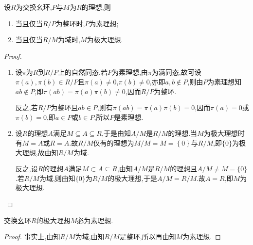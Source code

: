 \documentclass[../../main.tex]{subfiles}%
\begin{document}
\begin{theorem}\label{theorem:抽象代数--定理2.8.1}
设$R$为交换幺环,$P$与$M$为$R$的理想,则
\begin{enumerate}[(1)]
\item\label{theorem:抽象代数--定理2.8.1-1} 当且仅当$R/P$为整环时,$P$为素理想;

\item\label{theorem:抽象代数--定理2.8.1-2} 当且仅当$R/M$为域时,$M$为极大理想.
\end{enumerate}
\end{theorem}
\begin{proof}
\begin{enumerate}[(1)]
\item 设$\pi$为$R$到$R/P$上的自然同态.若$P$为素理想,由$\pi$为满同态,故可设$\pi(a),\pi(b)\in R/P$且$\pi(a) \neq 0$,$\pi(b) \neq 0$,亦即$a,b \notin P$,则由$P$为素理想知$ab \notin P$,即$\pi(ab) = \pi(a)\pi(b) \neq 0$,因而$R/P$为整环.

反之,若$R/P$为整环且$ab \in P$,则有$\pi(ab) = \pi(a)\pi(b) = 0$,因而$\pi(a) = 0$或$\pi(b) = 0$,即$a \in P$或$b \in P$,所以$P$是素理想.

\item 设$R$的理想$A$满足$M \subseteq A \subseteq R$,于是由知$A/M$是$R/M$的理想.当$M$为极大理想时有$M = A$或$R = A$.故$R/M$仅有的理想为$M/M=M=\left\{ 0 \right\} $与$R/M$,即$\{0\}$为极大理想,故由知$R/M$为域.

反之,设$R$的理想$A$满足$M \subset A \subseteq R$,由知$A/M$是$R/M$的理想且$A/M\neq M=\{0\}$.若$R/M$为域,则由知$\{0\}$为$R/M$的极大理想,于是$A/M = R/M$.故$A = R$,即$M$为极大理想.
\end{enumerate}

\end{proof}

\begin{corollary}\label{corollary:抽象代数--推论2.8.1}
交换幺环$R$的极大理想$M$必为素理想.
\end{corollary}
\begin{proof}

事实上,由知$R/M$为域,由知$R/M$是整环,所以再由知$M$为素理想.

\end{proof}
\end{document}
